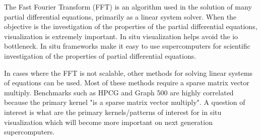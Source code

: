 \license


The Fast Fourier Transform (FFT) is an algorithm used in the solution of many partial differential equations, primarily as a linear system solver. When the objective is the investigation of the properties of the partial differential equations, visualization is extremely important. In situ visualization helps avoid the io bottleneck. In situ frameworks make it easy to use supercomputers for scientific investigation of the properties of partial differential equations. 

In cases where the FFT is not scalable, other methods for solving linear systems of equations can be used. Most of these methods require a sparse matrix vector multiply. Benchmarks such as HPCG and Graph 500 are highly correlated because the primary kernel "is a sparse matrix vector multiply". A question of interest is what are the primary kernels/patterns of interest for in situ visualization which will become more important on next generation supercomputers.


